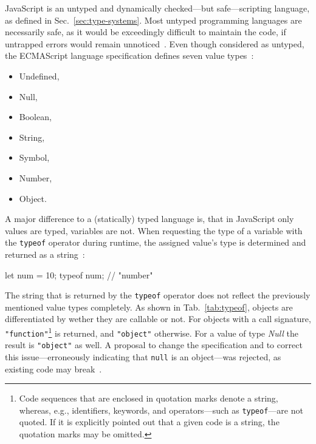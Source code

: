 JavaScript is an untyped and dynamically checked---but safe---scripting language, as defined in Sec.~\ref{sec:type-systems}. Most untyped programming languages are necessarily safe, as it would be exceedingly difficult to maintain the code, if untrapped errors would remain unnoticed~\cite[p.~97-4]{TypeSystems:Cardelli:2004}. Even though considered as untyped, the ECMAScript language specification defines seven value types~\cite[p.~16]{ES6Spec:Ecma:2015}:
\begin{itemize}
  \item Undefined,
  \item Null,
  \item Boolean,
  \item String,
  \item Symbol,
  \item Number,
  \item Object.
\end{itemize}
A major difference to a (statically) typed language is, that in JavaScript only values are typed, variables are not. When requesting the type of a variable with the \texttt{typeof} operator during runtime, the assigned value's type is determined and returned as a string~\cite[p.~30]{YDKJS:UpAndGoing:Simpson:2015}:
\begin{JsCode}[numbers=none]
let num = 10;
typeof num; // "number"
\end{JsCode}

\noindent
The string that is returned by the \texttt{typeof} operator does not reflect the previously mentioned value types completely. As shown in Tab.~\ref{tab:typeof}, objects are differentiated by wether they are callable or not. For objects with a call signature, \texttt{"function"}\footnote{Code sequences that are enclosed in quotation marks denote a string, whereas, e.g., identifiers, keywords, and operators---such as \texttt{typeof}---are not quoted. If it is explicitly pointed out that a given code is a string, the quotation marks may be omitted.} is returned, and \texttt{"object"} otherwise. For a value of type \emph{Null} the result is \texttt{"object"} as well. A proposal to change the specification and to correct this issue---erroneously indicating that \texttt{null} is an object---was rejected, as existing code may break~\cite{TypeofNull:Smith:2013, typeof:MDN:2017}.

